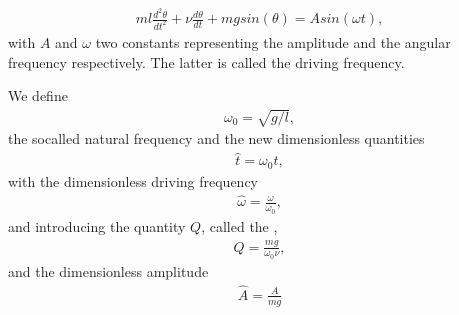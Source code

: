 \documentclass[letterpaper,10pt,english]{sphinxmanual}
\begin{document}
\begin{equation*}
\begin{split}
\begin{equation}
   ml\frac{d^2\theta}{dt^2}+\nu\frac{d\theta}{dt}  +mgsin(\theta)=Asin(\omega t), \label{eq:pend2} \tag{50}
\end{equation}
\end{split}
\end{equation*}
with \(A\) and \(\omega\) two constants representing the amplitude and
the angular frequency respectively. The latter is called the driving frequency.

We define
\begin{equation*}
\begin{split}
\omega_0=\sqrt{g/l},
\end{split}
\end{equation*}
the so\sphinxhyphen{}called natural frequency and the new dimensionless quantities
\begin{equation*}
\begin{split}
\hat{t}=\omega_0t,
\end{split}
\end{equation*}
with the dimensionless driving frequency
\begin{equation*}
\begin{split}
\hat{\omega}=\frac{\omega}{\omega_0},
\end{split}
\end{equation*}
and introducing the quantity \(Q\), called the ,
\begin{equation*}
\begin{split}
Q=\frac{mg}{\omega_0\nu},
\end{split}
\end{equation*}
and the dimensionless amplitude
\begin{equation*}
\begin{split}
\hat{A}=\frac{A}{mg}
\end{split}
\end{equation*}
\end{document}

